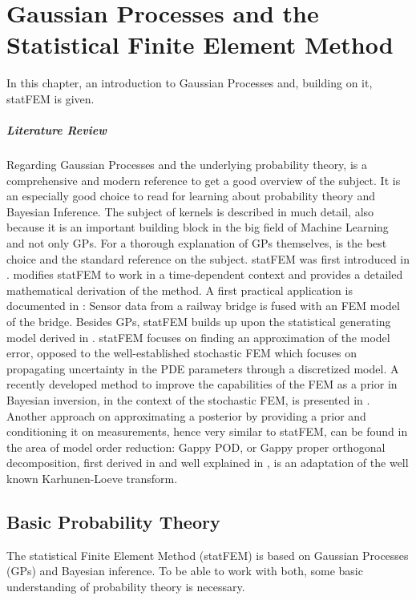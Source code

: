 \documentclass[%
  a4paper,oneside,%
  11pt,%
  smallchapters,
  style=printdev,
  extramargin,
  green,%
  rgb, <cmyk>
  ]{tubsbook}
\begin{document}
\chapter{Gaussian Processes and the Statistical Finite Element Method}
In this chapter, an introduction to Gaussian Processes and, building on it, statFEM is given. 

\paragraph{Literature Review} Regarding Gaussian Processes and the underlying probability theory, \cite{murphy2012} is a comprehensive and modern reference to get a good overview of the subject. It is an especially good choice to read for learning about probability theory and Bayesian Inference. The subject of kernels is described in much detail, also because it is an important building block in the big field of Machine Learning and not only GPs. For a thorough explanation of GPs themselves, \cite{rasmussen2006} is the best choice and the standard reference on the subject. statFEM was first introduced in \cite{girolami2021}. \cite{Duffin2020} modifies statFEM to work in a time-dependent context and provides a detailed mathematical derivation of the method. A first practical application is documented in \cite{Febrianto2021}: Sensor data from a railway bridge is fused with an FEM model of the bridge. Besides GPs, statFEM builds up upon the statistical generating model derived in \cite{kennedy2001}. statFEM focuses on finding an approximation of the model error, opposed to the well-established stochastic FEM \cite{Stefanou2009} which focuses on propagating uncertainty in the PDE parameters through a discretized model. A recently developed method to improve the capabilities of the FEM as a prior in Bayesian inversion, in the context of the stochastic FEM, is presented in \cite{Abdulle2021}. 
Another approach on approximating a posterior by providing a prior and conditioning it on measurements, hence very similar to statFEM, can be found in the area of model order reduction: Gappy POD, or Gappy proper orthogonal decomposition, first derived in \cite{Everson1995} and well explained in \cite{StevenL.Brunton2019}, is an adaptation of the well known Karhunen-Loeve transform. \cite{Rao2001} \cite{Loeve1994}

\section{Basic Probability Theory}
The statistical Finite Element Method (statFEM) is based on Gaussian Processes (GPs) and Bayesian inference. To be able to work with both, some basic understanding of probability theory is necessary.
\end{document}
